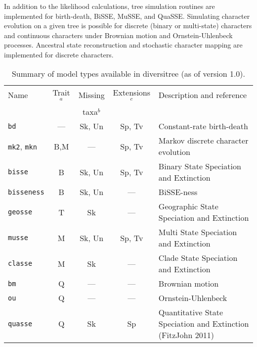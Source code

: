 \documentclass[12pt]{article}
\newcommand\code\texttt
\begin{document}
In addition to the likelihood calculations, tree simulation routines
are implemented for birth-death, BiSSE, MuSSE, and QuaSSE.
Simulating character evolution on a given tree is possible for
discrete (binary or multi-state) characters and continuous characters
under Brownian motion and Ornstein-Uhlenbeck processes.
Ancestral state reconstruction \citep{Schluter-1997-1699} and
stochastic character mapping \citep{Bollback-2006-88} are implemented
for discrete characters.

\begin{table}
  \caption[Summary of model types available in diversitree]{Summary of
    model types available in diversitree (as of version 1.0).}
  \label{tab:model-types}

  \vspace{12pt}
  \begin{tabularx}{\textwidth}{lccc>{\raggedright\arraybackslash}X}\hline
    Name   & Trait$^a$& Missing & Extensions$^{c}$ &
    Description and reference\\
    &&taxa${^b}$\\\hline
    \code {bd}     & ---  & Sk, Un & Sp, Tv
    &Constant-rate birth-death \citep{Nee-1994-305}
    \\
    \code{mk2}, \code{mkn} & B,M   & ---    & Sp, Tv
    &Markov discrete character evolution\phantom{NEWL} %
    \citep{Pagel-1994-37,Lewis-2001-913}
    \\
    \code{bisse}  & B    & Sk, Un & Sp, Tv
    &Binary State Speciation and Extinction
    \citep{Maddison-2007-701,FitzJohn-2009-595}
    \\
    \code{bisseness} & B    & Sk, Un     & ---
    &BiSSE-ness
    \citep{Magnuson-Ford-2012}
    \\
    \code{geosse} & T    & Sk     & ---
    &Geographic State Speciation and Extinction \citep{Goldberg-2011-451}
    \\
    \code{musse}  & M    & Sk, Un & Sp, Tv
    &Multi State Speciation and Extinction
    \\
    \code{classe} & M    & Sk     & ---
    &Clade State Speciation and Extinction \citep{Goldberg-classe}
    \\
    \code{bm}     & Q    & ---    & ---
    &Brownian motion
    \\
    \code{ou}     & Q    & ---    & ---
    &Ornstein-Uhlenbeck
    \\
    \code{quasse} & Q    & Sk     & Sp
    &Quantitative State Speciation and Extinction (FitzJohn 2011)
    \\\hline
  \end{tabularx}


\end{table}
\end{document}
